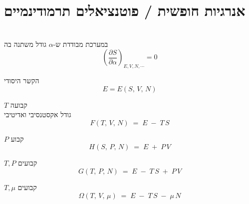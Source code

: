 \section{אנרגיות חופשית / פוטנציאלים תרמודינמיים}

\begin{cheatformula}\\
במערכת מבודדת ש-$\alpha$ גודל משתנה בה
$$\left( \frac{\partial S}{\partial \alpha} \right)_{E,V,N,\cdots} = 0$$
\end{cheatformula}

\begin{cheatformula}
הקשר היסודי
$$E = E(S,\,V,\,N)$$
\end{cheatformula}

\begin{cheatformula}
$T$ קבועה
\\  גודל אקסטנסיבי ואדיטיבי
$$ F(T,\,V,\,N) \;=\; E \;-\; T\,S$$
\end{cheatformula}

\begin{cheatformula}[אנתלפיה]
$P$ קבוע
$$H(S,\,P,\,N) \;=\; E \;+\; P\,V$$
\end{cheatformula}

\begin{cheatformula}
$T,P$ קבועים
$$G(T,\,P,\,N) \;=\; E \;-\; T\,S \;+\; P\,V$$
\end{cheatformula}


\begin{cheatformula}
$T,\mu$ קבועים
$$\Omega(T,\,V,\,\mu) \;=\; E \;-\; T\,S \;-\; \mu\,N$$
\end{cheatformula}
